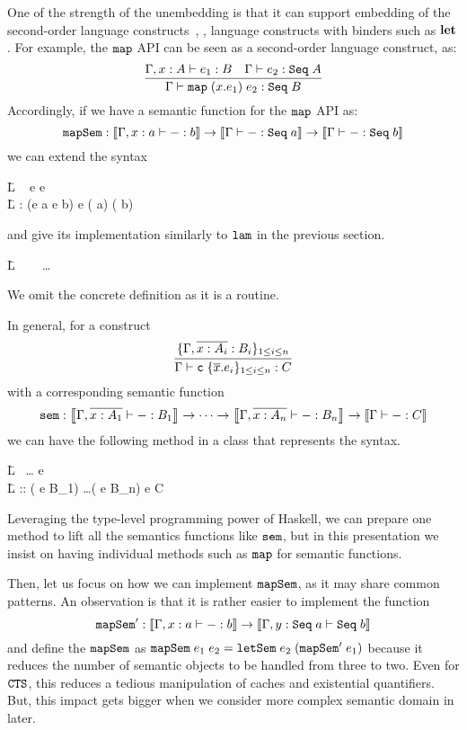 \documentclass{article}
\theoremstyle{definition}
\begin{document}
One of the strength of the unembedding is that it can support embedding of the second-order language constructs~, \ie, language constructs with binders such as $\mathbf{let}$. 
For example, the $\texttt{map}$ API can be seen as a second-order language construct, as: 
\[
\infer
{
 \Gamma \vdash \var{map} \A (x.e_1) \A e_2 : \con{Seq} \A B 
}
{
 \Gamma, x : A \vdash e_1 : B 
 & 
 \Gamma \vdash e_2 : \con{Seq} \A A
}
\]
Accordingly, if we have a semantic function for the $\texttt{map}$ API as:
\[
\var{mapSem} : \sem{ \Gamma, x : a \vdash - : b } \to \sem{ \Gamma \vdash - : \con{Seq} \A a} \to  \sem{ \Gamma \vdash - : \con{Seq} \A b }
\]
we can extend the syntax 
\begin{code}
\=L ~ \A e \To {} \A e~~\\
\=L \quad 
         : (e \A a \to e \A b) \to e \A ( \A a) \to ( \A b) 
\end{code}
and give its implementation similarly to $\texttt{lam}$ in the previous section. 
\begin{code}
\=L ~ \A {}~\WHERE~\dots 
\end{code}
We omit the concrete definition as it is a routine. 

In general, for a construct 
\[
\infer
{ 
 \Gamma \vdash \con{c} \A \{ \V{x}.e_i \}_{1 \le i \le n} : C
}
{
  \{ \Gamma, \V{x : A_i} : B_i \}_{1 \le i \le n}
}
\]
with a corresponding semantic function 
\[
\var{sem} : \sem{ \Gamma, \V{x : A_1} \vdash - : B_1} \to \dots \to \sem{ \Gamma, \V{x : A_n} \vdash - : B_n} \to \sem{ \Gamma \vdash - : C }
\]
we can have the following method in a class that represents the syntax. 
\begin{code}
\=L ~\dots \To {} \A e~\WHERE\\
\=L \quad {} :: ( \to e \A B_1) \to \dots \to ( \to e \A B_n) \to e \A C 
\end{code}
Leveraging the type-level programming power of Haskell, we can prepare one method to lift all the semantics functions like $\texttt{sem}$, but in this presentation we 
insist on having individual methods such as $\texttt{map}$ for semantic functions. 

Then, let us focus on how we can implement $\texttt{mapSem}$, as it may share common patterns. An observation is that it is rather easier to 
implement the function 
\[
\var{mapSem}' : \sem{ \Gamma, x : a \vdash - : b } \to \sem{ \Gamma, y : \con{Seq} \A a \vdash \con{Seq} \A b }
\]
and define the $\texttt{mapSem}$ as $\texttt{mapSem} \; e_1 \; e_2 = \texttt{letSem} \; e_2 \; (\texttt{mapSem}' \; e_1)$
because it reduces the number of semantic objects to be handled from three to two. Even for $\texttt{CTS}$, this reduces a tedious 
manipulation of caches and existential quantifiers. But, this impact gets bigger when we consider more complex semantic domain in later. 





\end{document}
